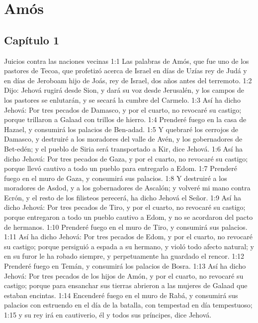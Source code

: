 \chapter{Amós}



\section*{Capítulo 1  }
Juicios contra las naciones vecinas   
1:1 Las palabras de Amós, que fue uno de los pastores de Tecoa, que profetizó acerca de Israel en días de Uzías rey de Judá y en días de Jeroboam hijo de Joás, rey de Israel, dos años antes del terremoto.   
1:2 Dijo: Jehová rugirá desde Sion, y dará su voz desde Jerusalén, y los campos de los pastores se enlutarán, y se secará la cumbre del Carmelo.   
1:3 Así ha dicho Jehová: Por tres pecados de Damasco, y por el cuarto, no revocaré su castigo; porque trillaron a Galaad con trillos de hierro.   
1:4 Prenderé fuego en la casa de Hazael, y consumirá los palacios de Ben-adad.   
1:5 Y quebraré los cerrojos de Damasco, y destruiré a los moradores del valle de Avén, y los gobernadores de Bet-edén; y el pueblo de Siria será transportado a Kir, dice Jehová.   
1:6 Así ha dicho Jehová: Por tres pecados de Gaza, y por el cuarto, no revocaré su castigo; porque llevó cautivo a todo un pueblo para entregarlo a Edom.   
1:7 Prenderé fuego en el muro de Gaza, y consumirá sus palacios.   
1:8 Y destruiré a los moradores de Asdod, y a los gobernadores de Ascalón; y volveré mi mano contra Ecrón, y el resto de los filisteos  perecerá, ha dicho Jehová el Señor.   
1:9 Así ha dicho Jehová: Por tres pecados de Tiro, y por el cuarto, no revocaré su castigo; porque entregaron a todo un pueblo cautivo a Edom, y no se acordaron del pacto de hermanos.   
1:10 Prenderé fuego en el muro de Tiro, y consumirá sus palacios.   
1:11 Así ha dicho Jehová: Por tres pecados de Edom, y por el cuarto, no revocaré su castigo; porque persiguió a espada a su hermano, y violó todo afecto natural; y en su furor le ha robado siempre, y perpetuamente ha guardado el rencor.   
1:12 Prenderé fuego en Temán, y consumirá los palacios de Bosra.   
1:13 Así ha dicho Jehová: Por tres pecados de los hijos de Amón, y por el cuarto, no revocaré su castigo; porque para ensanchar sus tierras abrieron a las mujeres de Galaad que estaban encintas.   
1:14 Encenderé fuego en el muro de Rabá, y consumirá sus palacios con estruendo en el día de la batalla, con tempestad en día tempestuoso;   
1:15 y su rey irá en cautiverio, él y todos sus príncipes, dice Jehová.   
